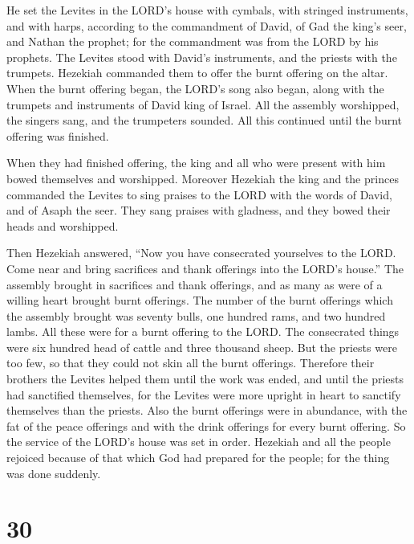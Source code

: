  He set the Levites in the LORD's house with cymbals, with
stringed instruments, and with harps, according to the commandment of
David, of Gad the king's seer, and Nathan the prophet; for the
commandment was from the LORD by his prophets.  The Levites
stood with David's instruments, and the priests with the trumpets.
 Hezekiah commanded them to offer the burnt offering on the
altar. When the burnt offering began, the LORD's song also began, along
with the trumpets and instruments of David king of Israel. 
All the assembly worshipped, the singers sang, and the trumpeters
sounded. All this continued until the burnt offering was finished.

 When they had finished offering, the king and all who were
present with him bowed themselves and worshipped.  Moreover
Hezekiah the king and the princes commanded the Levites to sing praises
to the LORD with the words of David, and of Asaph the seer. They sang
praises with gladness, and they bowed their heads and worshipped.

 Then Hezekiah answered, ``Now you have consecrated
yourselves to the LORD. Come near and bring sacrifices and thank
offerings into the LORD's house.'' The assembly brought in sacrifices
and thank offerings, and as many as were of a willing heart brought
burnt offerings.  The number of the burnt offerings which
the assembly brought was seventy bulls, one hundred rams, and two
hundred lambs. All these were for a burnt offering to the LORD.
 The consecrated things were six hundred head of cattle and
three thousand sheep.  But the priests were too few, so
that they could not skin all the burnt offerings. Therefore their
brothers the Levites helped them until the work was ended, and until the
priests had sanctified themselves, for the Levites were more upright in
heart to sanctify themselves than the priests.  Also the
burnt offerings were in abundance, with the fat of the peace offerings
and with the drink offerings for every burnt offering. So the service of
the LORD's house was set in order.  Hezekiah and all the
people rejoiced because of that which God had prepared for the people;
for the thing was done suddenly.

\hypertarget{section-29}{%
\section{30}\label{section-29}}

